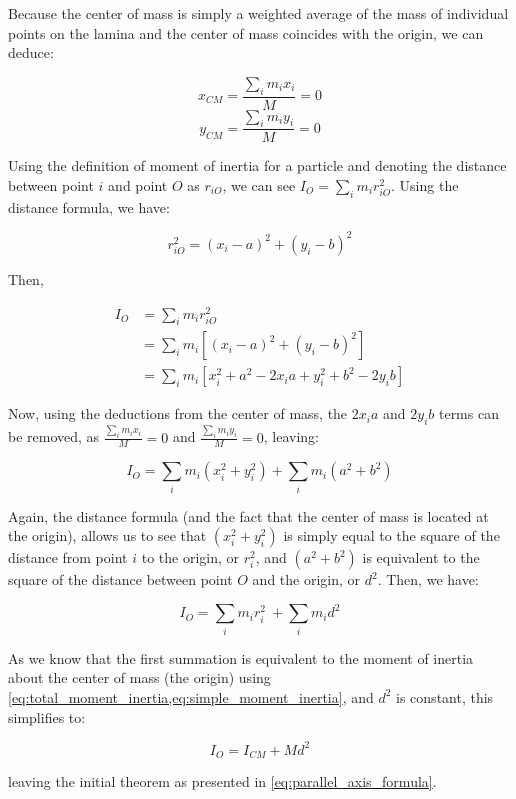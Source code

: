 Because the center of mass is simply a weighted average of the mass of individual points on the lamina and the center of mass coincides with the origin, we can deduce:

\[x_{CM} = \frac{\sum_i m_ix_i}{M} = 0 \]
\[y_{CM} = \frac{\sum_i m_iy_i}{M} = 0 \]

Using the definition of moment of inertia for a particle and denoting the distance between point $i$ and point $O$ as $r_{iO}$, we can see $I_O = \sum_i m_i r_{iO}^2$. Using the distance formula, we have:

\[r_{iO}^2 = (x_i-a)^2 + (y_i-b)^2\]

Then,

\begin{align*}
I_O &= \sum_i m_i r_{iO}^2 \\
&= \sum_i m_i \left[(x_i-a)^2 + (y_i-b)^2\right] \\
&= \sum_i m_i \left[x_i^2 + a^2 - 2x_ia + y_i^2 + b^2 - 2y_ib\right]
\end{align*}

Now, using the deductions from the center of mass, the $2x_ia$ and $2y_ib$ terms can be removed, as $\frac{\sum_i m_ix_i}{M} = 0$ and $\frac{\sum_i m_iy_i}{M} = 0$, leaving:

\[I_O = \sum_i m_i (x_i^2 + y_i^2) + \sum_i m_i (a^2 + b^2) \]

Again, the distance formula (and the fact that the center of mass is located at the origin), allows us to see that $(x_i^2 + y_i^2)$ is simply equal to the square of the distance from point $i$ to the origin, or $r_i^2$, and $(a^2 + b^2)$ is equivalent to the square of the distance between point $O$ and the origin, or $d^2$. Then, we have:

\[I_O = \sum_i m_i r_i^2\ + \sum_i m_id^2\]

As we know that the first summation is equivalent to the moment of inertia about the center of mass (the origin) using \cref{eq:total_moment_inertia,eq:simple_moment_inertia}, and $d^2$ is constant, this simplifies to:

\[I_O = I_{CM} + Md^2\]

leaving the initial theorem as presented in \cref{eq:parallel_axis_formula}.
